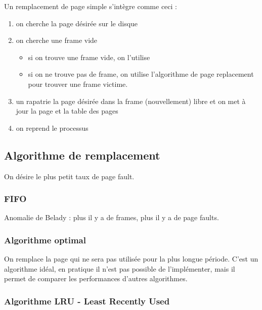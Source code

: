 	Un remplacement de page simple s'intègre comme ceci :
	
	\begin{enumerate}
		\item on cherche la page désirée sur le disque
		\item on cherche une frame vide
		
		\begin{itemize}
			\item si on trouve une frame vide, on l'utilise
			\item si on ne trouve pas de frame, on utilise l'algorithme de page replacement pour trouver une frame victime.
		\end{itemize}
		
		\item un rapatrie la page désirée dans la frame (nouvellement) libre et on met à jour la page et la table des pages
		\item on reprend le processus
	\end{enumerate}
	
	
	
	\subsection{Algorithme de remplacement}
	
	On désire le plus petit taux de page fault.
	
		\subsubsection{FIFO}
		
		
		Anomalie de Belady : plus il y a de frames, plus il y a de page faults.
		
		
		\subsubsection{Algorithme optimal}
		
		On remplace la page qui ne sera pas utilisée pour la plus longue période. C'est un algorithme idéal, en pratique il n'est pas possible de l'implémenter, mais il permet de comparer les performances d'autres algorithmes.
		
		
		\subsubsection{Algorithme LRU - Least Recently Used}
		
